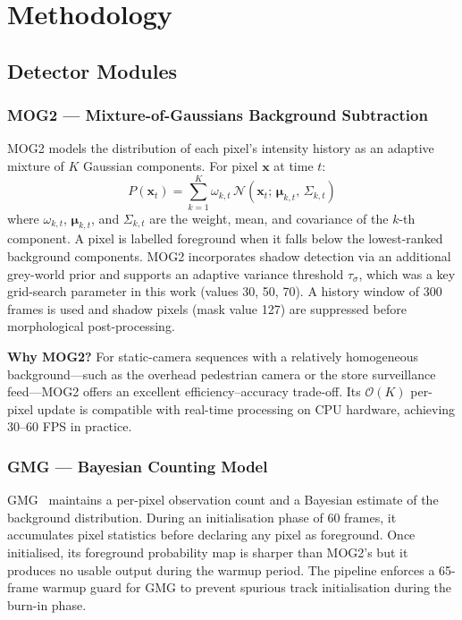 \documentclass[10pt, conference, compsocconf]{IEEEtran}
\begin{document}
\section{Methodology}

\subsection{Detector Modules}

\subsubsection{MOG2 --- Mixture-of-Gaussians Background Subtraction}
MOG2 models the distribution of each pixel's intensity history as an
adaptive mixture of $K$ Gaussian components. For pixel $\mathbf{x}$
at time $t$:
\begin{equation}
  P(\mathbf{x}_t) = \sum_{k=1}^{K} \omega_{k,t}\,
  \mathcal{N}\!\left(\mathbf{x}_t;\,\boldsymbol{\mu}_{k,t},\,
  \Sigma_{k,t}\right)
  \label{eq:gmm}
\end{equation}
where $\omega_{k,t}$, $\boldsymbol{\mu}_{k,t}$, and $\Sigma_{k,t}$
are the weight, mean, and covariance of the $k$-th component. A pixel
is labelled foreground when it falls below the lowest-ranked
background components. MOG2 incorporates shadow detection via an
additional grey-world prior and supports an adaptive variance
threshold $\tau_\sigma$, which was a key grid-search parameter in
this work (values 30, 50, 70). A history window of 300 frames is used
and shadow pixels (mask value 127) are suppressed before morphological
post-processing.

\textbf{Why MOG2?} For static-camera sequences with a relatively
homogeneous background---such as the overhead pedestrian camera or
the store surveillance feed---MOG2 offers an excellent
efficiency--accuracy trade-off. Its $\mathcal{O}(K)$ per-pixel
update is compatible with real-time processing on CPU hardware,
achieving 30--60 FPS in practice.

\subsubsection{GMG --- Bayesian Counting Model}
GMG~\cite{godbehere2012} maintains a per-pixel observation count and
a Bayesian estimate of the background distribution. During an
initialisation phase of 60 frames, it accumulates pixel
statistics before declaring any pixel as foreground. Once initialised,
its foreground probability map is sharper than MOG2's but it
produces no usable output during the warmup period. The pipeline
enforces a 65-frame warmup guard for GMG to prevent spurious track
initialisation during the burn-in phase.
\end{document}
